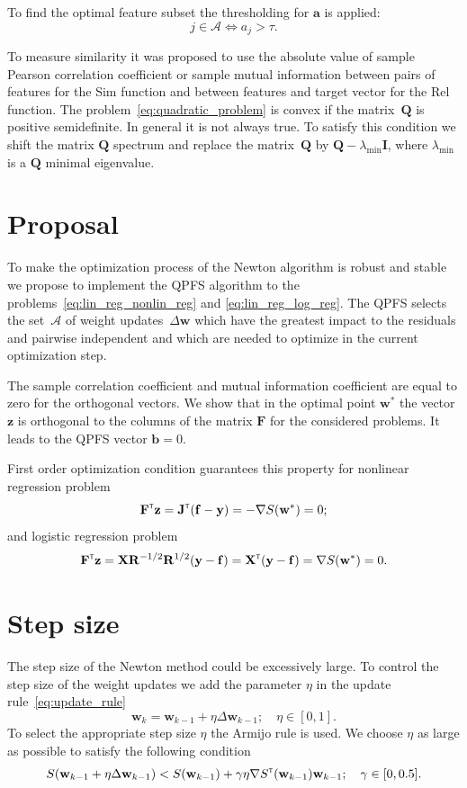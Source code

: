 \documentclass[a4paper,12pt]{article}
\theoremstyle{plain} %
\theoremstyle{definition} %
\theoremstyle{remark} %
\newcommand{\ba}{\mathbf{a}}
\newcommand{\bb}{\mathbf{b}}
\newcommand{\bw}{\mathbf{w}}
\newcommand{\by}{\mathbf{y}}
\newcommand{\bz}{\mathbf{z}}
\newcommand{\cA}{\mathcal{A}}
\newcommand{\bJ}{\mathbf{J}}
\newcommand{\bQ}{\mathbf{Q}}
\newcommand{\bF}{\mathbf{F}}
\newcommand{\bR}{\mathbf{R}}
\newcommand{\bX}{\mathbf{X}}
\newcommand{\T}{{\text{\tiny\sffamily\upshape\mdseries T}}}
\begin{document}
  	To find the optimal feature subset the thresholding for $\ba$ is applied:
  	\[
  		j \in \mathcal{A} \Leftrightarrow a_j > \tau.
  	\]
  	
  	To measure similarity it was proposed to use the absolute value of sample Pearson correlation coefficient or sample mutual information between pairs of features for the Sim function and between features and target vector for the Rel function.
  	The problem~\eqref{eq:quadratic_problem} is convex if the matrix~$\bQ$ is positive semidefinite. In general it is not always true. 
  	To satisfy this condition we shift the matrix $\bQ$ spectrum and replace the matrix~$\bQ$ by $\bQ - \lambda_{\text{min}} \mathbf{I}$, where $\lambda_{\text{min}} $ is a $\bQ$ minimal eigenvalue.
  	
  	\section*{Proposal}
  	
  	To make the optimization process of the Newton algorithm is robust and stable we propose to implement the QPFS algorithm to the problems~\eqref{eq:lin_reg_nonlin_reg} and \eqref{eq:lin_reg_log_reg}. 
  	The QPFS selects the set~$\cA$ of weight updates~$\Delta \bw$ which have the greatest impact to the residuals and pairwise independent and which are needed to optimize in the current optimization step. 
  	
  	The sample correlation coefficient and mutual information coefficient are equal to zero for the orthogonal vectors.
  	We show that in the optimal point $\bw^*$ the vector $\bz$ is orthogonal to the columns of the matrix $\bF$ for the considered problems. It leads to the QPFS vector $\bb = 0$.
  	
	First order optimization condition guarantees this property for nonlinear regression problem
	\[
		\bF^{\T} \bz = \bJ^{\T} (\mathbf{f} - \by) = - \nabla S(\bw^*) = 0;
	\]
	and logistic regression problem
	\[
		\bF^{\T} \bz = \bX \bR^{-1/2} \bR^{1/2} (\by - \mathbf{f}) = \bX^{\T} (\by - \mathbf{f}) = \nabla S(\bw^*) = 0.
	\]


	\section*{Step size}
	
	The step size of the Newton method could be excessively large. To control the step size of the weight updates we add the parameter $\eta$ in the update rule~\eqref{eq:update_rule}
	\[
		\bw_k = \bw_{k - 1} + \eta \Delta \bw_{k - 1}; \quad \eta \in [0, 1].
	\]
	To select the appropriate step size $\eta$ the Armijo rule is used. We choose $\eta$ as large as possible to satisfy the following condition
	\[
		S(\bw_{k - 1} + \eta \Delta \bw_{k - 1}) < S(\bw_{k - 1}) + \gamma \eta \nabla S^{\T}(\bw_{k-1})\bw_{k - 1}; \quad \gamma \in [0, 0.5].
	\]
	
\end{document}
